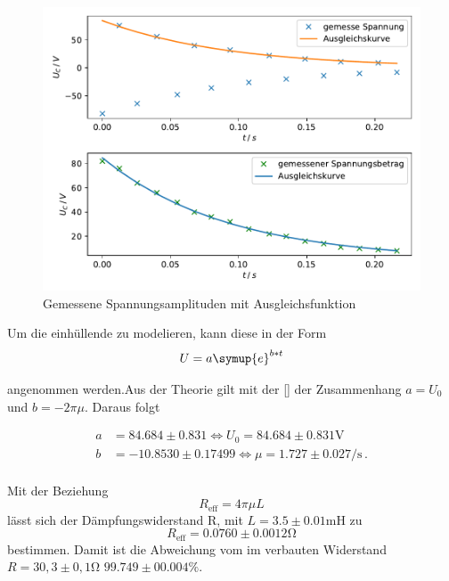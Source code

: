 \newpage
\begin{figure}
    \centering
    \label{fig:1}
    \includegraphics{Daten/a.pdf}
    \caption{Gemessene Spannungsamplituden mit Ausgleichsfunktion}
\end{figure}

Um die einhüllende zu modelieren, kann diese in der Form
\begin{equation}
    U = a \symup{e}^{b*t}
\end{equation}

\noindent
angenommen werden.Aus der Theorie gilt mit der \autoref{} der Zusammenhang $a = U_0$ und $b = -2 \pi \mu$. Daraus folgt %


\begin{align*}
    a &= 84.684 \pm 0.831 \Leftrightarrow U_0 = 84.684 \pm 0.831 \si{\volt} \\
    b &= -10.8530 \pm 0.17499 \Leftrightarrow \mu = 1.727 \pm 0.027 \si{\per\second} \, .\\
\end{align*}

Mit der Beziehung 
\begin{equation}
    R_\text{eff} = 4\pi\mu L 
\end{equation}
lässt sich der Dämpfungswiderstand R, mit $L = 3.5 \pm 0.01 \si{\milli\henry}$ zu
\begin{equation*}
    R_\text{eff} = 0.0760 \pm 0.0012 \si{\ohm}
\end{equation*}
bestimmen. Damit ist die Abweichung vom im verbauten Widerstand $R = 30,3 \pm 0,1 \si{\ohm}$ $99.749 \pm 00.004 \si{\percent}$.

